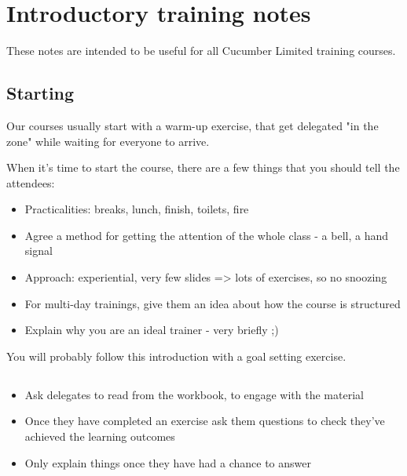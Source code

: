 \ifnotes

    \chapter*{Introductory training notes}

    These notes are intended to be useful for all Cucumber Limited training courses.
    
    \section*{Starting}
    
    Our courses usually start with a warm-up exercise, that get delegated "in the zone" while waiting for everyone to arrive.
    
    When it's time to start the course, there are a few things that you should tell the attendees:
    
    \begin{itemize}
        \item Practicalities: breaks, lunch, finish, toilets, fire
        \item Agree a method for getting the attention of the whole class - a bell, a hand signal
        \item Approach: experiential, very few slides => lots of exercises, so no snoozing
        \item For multi-day trainings, give them an idea about how the course is structured
        \item Explain why you are an ideal trainer - very briefly ;)
    \end{itemize}
    
    You will probably follow this introduction with a goal setting exercise.

    \section*{}
    
    \begin{itemize}
        \item Ask delegates to read from the workbook, to engage with the material
        \item Once they have completed an exercise ask them questions to check they've achieved the learning outcomes
        \item Only explain things once they have had a chance to answer
    \end{itemize}

